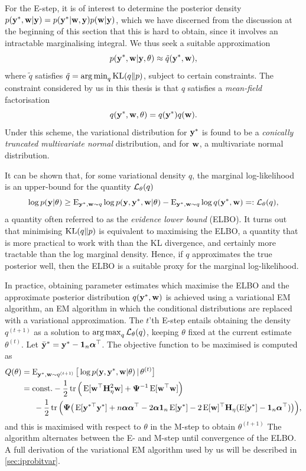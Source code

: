For the E-step, it is of interest to determine the posterior density $p({\mathbf y}^*,{\mathbf w}|{\mathbf y}) = p({\mathbf y}^*|{\mathbf w},{\mathbf y})p({\mathbf w}|{\mathbf y})$, which we have discerned from the discussion at the beginning of this section that this is hard to obtain, since it involves an intractable marginalising integral.
We thus seek a suitable approximation
\[
  p({\mathbf y}^*,{\mathbf w} | {\mathbf y}, \theta) \approx \tilde q({\mathbf y}^*,{\mathbf w}),
\]
where $\tilde q$ satisfies $\tilde q = \operatorname*{arg\,min}_q \operatorname{KL}(q\Vert p)$, subject to certain constraints.
The constraint considered by us in this thesis is that $q$ satisfies a \emph{mean-field} factorisation
\[
  q({\mathbf y}^*,{\mathbf w},\theta) = q({\mathbf y}^*)q({\mathbf w}).
\]
Under this scheme, the variational distribution for ${\mathbf y}^*$ is found to be a \emph{conically truncated multivariate normal} distribution, and for ${\mathbf w}$, a multivariate normal distribution.

It can be shown that, for some variational density $q$, the marginal log-likelihood is an upper-bound for the quantity ${\mathcal L}_\theta(q)$
\[
  \log p({\mathbf y}|\theta) \geq 
    \operatorname{E}_{{\mathbf y}^*,{\mathbf w}\sim q} \log p({\mathbf y},{\mathbf y}^*,{\mathbf w}|\theta)
    - \operatorname{E}_{{\mathbf y}^*,{\mathbf w}\sim q} \log  q({\mathbf y}^*,{\mathbf w}) =: {\mathcal L}_\theta(q),
\]
a quantity often referred to as the \emph{evidence lower bound} (ELBO).
It turns out that minimising $\operatorname{KL}(q\Vert p)$ is equivalent to maximising the ELBO, a quantity that is more practical to work with than the KL divergence, and certainly more tractable than the log marginal density.
Hence, if $q$ approximates the true posterior well, then the ELBO is a suitable proxy for the marginal log-likelihood.

In practice, obtaining parameter estimates which maximise the ELBO and the approximate posterior distribution $q({\mathbf y}^*,{\mathbf w}) $ is achieved using a variational EM algorithm, an EM algorithm in which the conditional distributions are replaced with a variational approximation.
The $t$'th E-step entails obtaining the density $q^{(t+1)}$ as a solution to $\operatorname*{arg\,max}_q {\mathcal L}_\theta(q)$, keeping $\theta$ fixed at the current estimate $\theta^{(t)}$.
Let $\bar{{\mathbf y}}^* = {\mathbf y}^* - {\mathbf 1}_n{\bm\alpha}^\top$.
The objective function to be maximised is computed as
\begin{align*}
  Q(\theta) 
  &= \operatorname{E}_{{\mathbf y}^*,{\mathbf w}\sim q^{(t+1)}}  \big[ \log p({\mathbf y},{\mathbf y}^*,{\mathbf w}|\theta) \,|\, \theta^{(t)} \big] \\
  &= \text{const.}\hspace{0.01em} -\frac{1}{2}\operatorname{tr}\Big( \operatorname{E}[{\mathbf w}^\top{\mathbf H}_\eta^2{\mathbf w}]  + {\bm\Psi}^{-1} \operatorname{E}[{\mathbf w}^\top{\mathbf w}] \Big)  \\
  &\phantom{==} - \frac{1}{2} \operatorname{tr} \Big( 
  {\bm\Psi} \big( 
  \operatorname{E}[{\mathbf y}^{*\top}{\mathbf y}^*] 
  + n {\bm\alpha}{\bm\alpha}^\top 
  - 2{\bm\alpha} {\mathbf 1}_n \operatorname{E}[{\mathbf y}^*]
  - 2\operatorname{E}[{\mathbf w}]^\top{\mathbf H}_\eta (\operatorname{E}[{\mathbf y}^*] - {\mathbf 1}_n{\bm\alpha}^\top) 
  \big) \Big)
  ,
\end{align*}
and this is maximised with respect to $\theta$ in the M-step to obtain $\theta^{(t+1)}$
The algorithm alternates between the E- and M-step until convergence of the ELBO.
A full derivation of the variational EM algorithm used by us will be described in \cref{sec:iprobitvar}.

